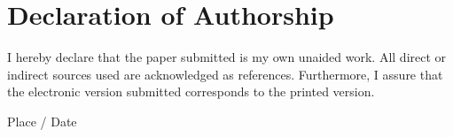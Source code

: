 \clearpage
\chapter*{Declaration of Authorship}

I hereby declare that the paper submitted is my own unaided work. All direct or indirect sources used are acknowledged as references. Furthermore, I assure that the electronic version submitted corresponds to the printed version.

\vspace{3cm}
Place / Date \hfill \DerAutorDerArbeit
